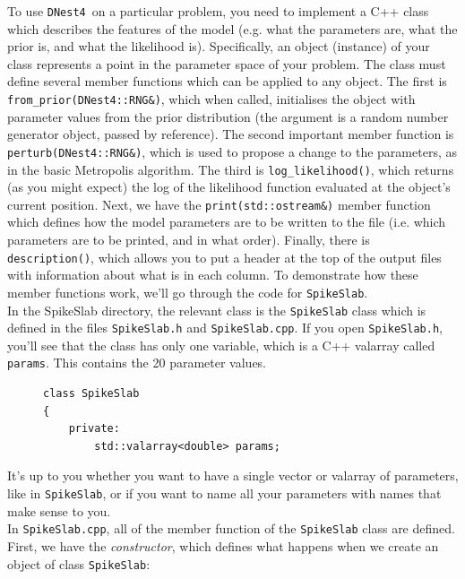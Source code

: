 \documentclass[a4paper, 11pt]{article}
\newcommand{\dnest}{{\tt DNest4}}
\begin{document}
To use \dnest~on a particular problem, you need to implement a C++ class
which describes the features of the model (e.g. what the parameters are,
what the prior is, and what the likelihood is). Specifically, an object
(instance) of your class represents a point in the parameter space of your
problem. The class must define several member functions which can be
applied to any object. The first is {\tt from_prior(DNest4::RNG&)},
which when called,
initialises the object with parameter values from the prior distribution
(the argument is a random number generator object, passed by reference).
The second important member function is {\tt perturb(DNest4::RNG&)}, which is used to propose
a change to the parameters, as in the basic Metropolis algorithm. The third
is {\tt log_likelihood()}, which returns (as you might expect)
the log of the likelihood function evaluated at the object's current position. Next,
we have the {\tt print(std::ostream\&)} member function which defines how the model
parameters are to be written to the file (i.e. which parameters are to be
printed, and in what order). Finally, there is {\tt description()},
which allows you to put a header at the top of the output files with information
about what is in each column. To demonstrate how these member functions work, we'll go
through the code for {\tt SpikeSlab}.\\

In the SpikeSlab directory,
the relevant class is the {\tt SpikeSlab} class which is defined in the files
{\tt SpikeSlab.h} and {\tt SpikeSlab.cpp}. If you open {\tt SpikeSlab.h},
you'll see that the class has only one variable, which is a C++ valarray called
{\tt params}. This contains the 20 parameter values.\\

\begin{figure}
\begin{framed}
\begin{verbatim}
class SpikeSlab
{
    private:
        std::valarray<double> params;
\end{verbatim}
\end{framed}
\end{figure}

It's up to you whether you want to have a single vector or valarray of parameters, like
in {\tt SpikeSlab}, or if you want to name all your parameters with names that
make sense to you.\\

In {\tt SpikeSlab.cpp}, all of the member function of the {\tt SpikeSlab} class
are defined. First, we have the {\it constructor}, which defines what happens
when we create an object of class {\tt SpikeSlab}:\\
\end{document}
